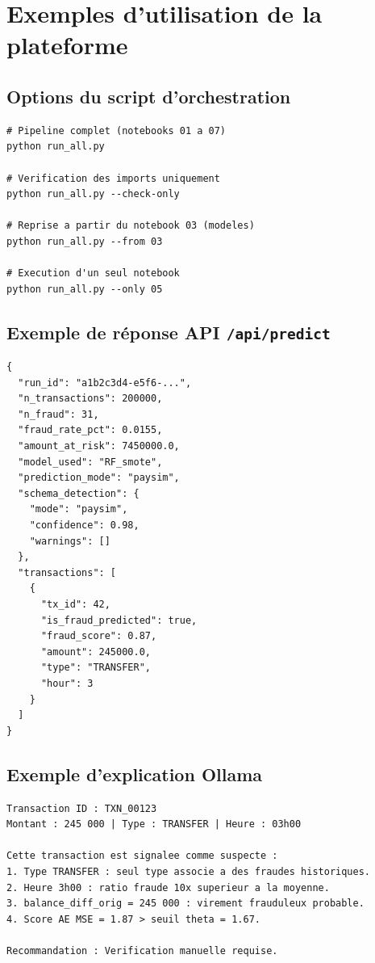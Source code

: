 \documentclass[12pt,a4paper,twoside]{report}
\begin{document}
\chapter{Exemples d'utilisation de la plateforme}

\section{Options du script d'orchestration}
\label{sec:run_all_options}

\begin{lstlisting}[caption={Commandes du pipeline run\_all.py}]
# Pipeline complet (notebooks 01 a 07)
python run_all.py

# Verification des imports uniquement
python run_all.py --check-only

# Reprise a partir du notebook 03 (modeles)
python run_all.py --from 03

# Execution d'un seul notebook
python run_all.py --only 05
\end{lstlisting}

\section{Exemple de réponse API \texttt{/api/predict}}
\label{sec:api_example}

\begin{lstlisting}[caption={Exemple de réponse JSON du endpoint de prédiction}]
{
  "run_id": "a1b2c3d4-e5f6-...",
  "n_transactions": 200000,
  "n_fraud": 31,
  "fraud_rate_pct": 0.0155,
  "amount_at_risk": 7450000.0,
  "model_used": "RF_smote",
  "prediction_mode": "paysim",
  "schema_detection": {
    "mode": "paysim",
    "confidence": 0.98,
    "warnings": []
  },
  "transactions": [
    {
      "tx_id": 42,
      "is_fraud_predicted": true,
      "fraud_score": 0.87,
      "amount": 245000.0,
      "type": "TRANSFER",
      "hour": 3
    }
  ]
}
\end{lstlisting}

\section{Exemple d'explication Ollama}
\label{sec:ollama_example_app}

\begin{lstlisting}[caption={Exemple d'explication generee par Ollama}]
Transaction ID : TXN_00123
Montant : 245 000 | Type : TRANSFER | Heure : 03h00

Cette transaction est signalee comme suspecte :
1. Type TRANSFER : seul type associe a des fraudes historiques.
2. Heure 3h00 : ratio fraude 10x superieur a la moyenne.
3. balance_diff_orig = 245 000 : virement frauduleux probable.
4. Score AE MSE = 1.87 > seuil theta = 1.67.

Recommandation : Verification manuelle requise.
\end{lstlisting}
\end{document}
